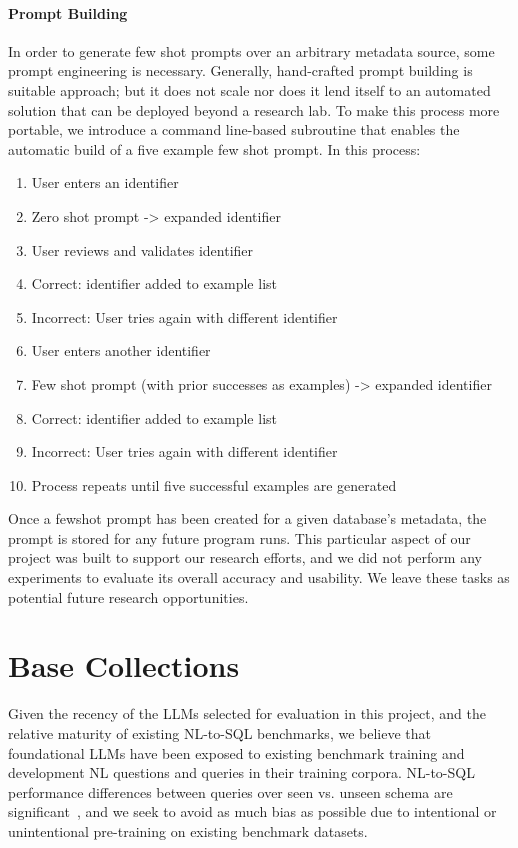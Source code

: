 \paragraph{\textbf{Prompt Building}}
In order to generate few shot prompts over an arbitrary metadata source, some prompt engineering is necessary.
Generally, hand-crafted prompt building is suitable approach; but it does not scale nor does it lend itself to an automated solution that can be deployed beyond a research lab.
To make this process more portable, we introduce a command line-based subroutine that enables the automatic build of a five example few shot prompt.
In this process:
\begin{enumerate}
  \item User enters an identifier
  \item Zero shot prompt -> expanded identifier
  \item User reviews and validates identifier
  \item Correct: identifier added to example list
  \item Incorrect: User tries again with different identifier
  \item User enters another identifier
  \item Few shot prompt (with prior successes as examples) -> expanded identifier
  \item Correct: identifier added to example list
  \item Incorrect: User tries again with different identifier
  \item Process repeats until five successful examples are generated
\end{enumerate}

Once a fewshot prompt has been created for a given database's metadata, the prompt is stored for any future program runs.
This particular aspect of our project was built to support our research efforts, and we did not perform any experiments to evaluate its overall accuracy and usability.
We leave these tasks as potential future research opportunities.



\section{Base Collections}


Given the recency of the LLMs selected for evaluation in this project, and the relative maturity of existing NL-to-SQL benchmarks, we believe that foundational LLMs have been exposed to existing benchmark training and development NL questions and queries in their training corpora.
NL-to-SQL performance differences between queries over seen vs. unseen schema are significant~\cite{49288}, and we seek to avoid as much bias as possible due to intentional or unintentional pre-training on existing benchmark datasets.

